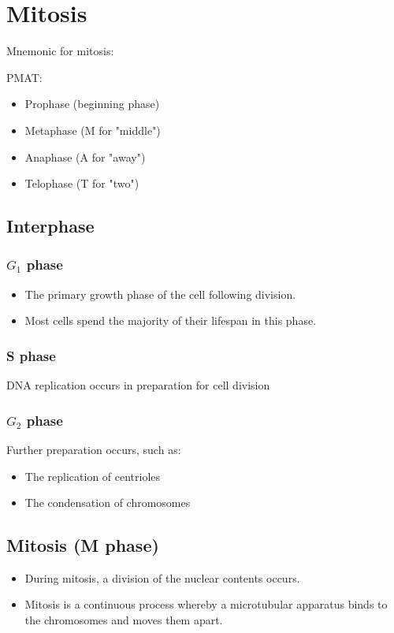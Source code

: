 \documentclass[11pt]{article}
\begin{document}
\newpage
\section{Mitosis}
\label{sec:org62b2bec}
Mnemonic for mitosis:


PMAT:
\begin{itemize}
\item Prophase (beginning phase)
\item Metaphase (M for "middle")
\item Anaphase (A for "away")
\item Telophase (T for "two")
\end{itemize}
\subsection{Interphase}
\label{sec:org4067a4b}

\subsubsection{\(G_1\) phase}
\label{sec:orgbbc5d8e}
\begin{itemize}
\item The primary growth phase of the cell following division.
\item Most cells spend the majority of their lifespan in this phase.
\end{itemize}
\subsubsection{S phase}
\label{sec:org836f4cc}
DNA replication occurs in preparation for cell division
\subsubsection{\(G_2\) phase}
\label{sec:org046c030}
Further preparation occurs, such as:
\begin{itemize}
\item The replication of centrioles
\item The condensation of chromosomes
\end{itemize}
\subsection{Mitosis (M phase)}
\label{sec:orgdc61fb4}
\begin{itemize}
\item During mitosis, a division of the nuclear contents occurs.
\item Mitosis is a continuous process whereby a microtubular apparatus binds to the chromosomes and moves them apart.
\end{itemize}
\end{document}
